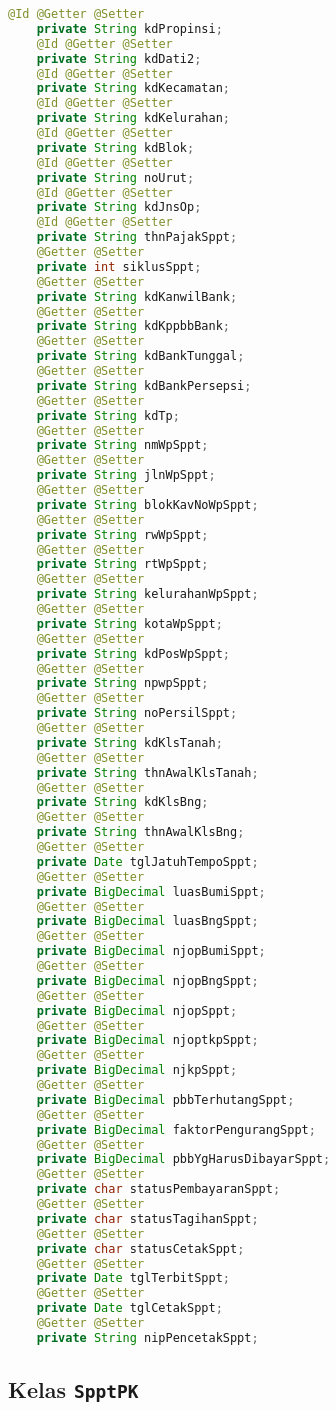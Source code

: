 \documentclass[pdftex,12pt, oneside]{article}
\begin{document}
\begin{lstlisting}[language=java]
    @Id @Getter @Setter
    private String kdPropinsi;
    @Id @Getter @Setter
    private String kdDati2;
    @Id @Getter @Setter
    private String kdKecamatan;
    @Id @Getter @Setter
    private String kdKelurahan;
    @Id @Getter @Setter
    private String kdBlok;
    @Id @Getter @Setter
    private String noUrut;
    @Id @Getter @Setter
    private String kdJnsOp;
    @Id @Getter @Setter
    private String thnPajakSppt;
    @Getter @Setter
    private int siklusSppt;
    @Getter @Setter
    private String kdKanwilBank;
    @Getter @Setter
    private String kdKppbbBank;
    @Getter @Setter
    private String kdBankTunggal;
    @Getter @Setter
    private String kdBankPersepsi;
    @Getter @Setter
    private String kdTp;
    @Getter @Setter
    private String nmWpSppt;
    @Getter @Setter
    private String jlnWpSppt;
    @Getter @Setter
    private String blokKavNoWpSppt;
    @Getter @Setter
    private String rwWpSppt;
    @Getter @Setter
    private String rtWpSppt;
    @Getter @Setter
    private String kelurahanWpSppt;
    @Getter @Setter
    private String kotaWpSppt;
    @Getter @Setter
    private String kdPosWpSppt;
    @Getter @Setter
    private String npwpSppt;
    @Getter @Setter
    private String noPersilSppt;
    @Getter @Setter
    private String kdKlsTanah;
    @Getter @Setter
    private String thnAwalKlsTanah;
    @Getter @Setter
    private String kdKlsBng;
    @Getter @Setter
    private String thnAwalKlsBng;
    @Getter @Setter
    private Date tglJatuhTempoSppt;
    @Getter @Setter
    private BigDecimal luasBumiSppt;
    @Getter @Setter
    private BigDecimal luasBngSppt;
    @Getter @Setter
    private BigDecimal njopBumiSppt;
    @Getter @Setter
    private BigDecimal njopBngSppt;
    @Getter @Setter
    private BigDecimal njopSppt;
    @Getter @Setter
    private BigDecimal njoptkpSppt;
    @Getter @Setter
    private BigDecimal njkpSppt;
    @Getter @Setter
    private BigDecimal pbbTerhutangSppt;
    @Getter @Setter
    private BigDecimal faktorPengurangSppt;
    @Getter @Setter
    private BigDecimal pbbYgHarusDibayarSppt;
    @Getter @Setter
    private char statusPembayaranSppt;
    @Getter @Setter
    private char statusTagihanSppt;
    @Getter @Setter
    private char statusCetakSppt;
    @Getter @Setter
    private Date tglTerbitSppt;
    @Getter @Setter
    private Date tglCetakSppt;
    @Getter @Setter
    private String nipPencetakSppt;
\end{lstlisting}

\subsection{Kelas \texttt{SpptPK}}
\end{document}
